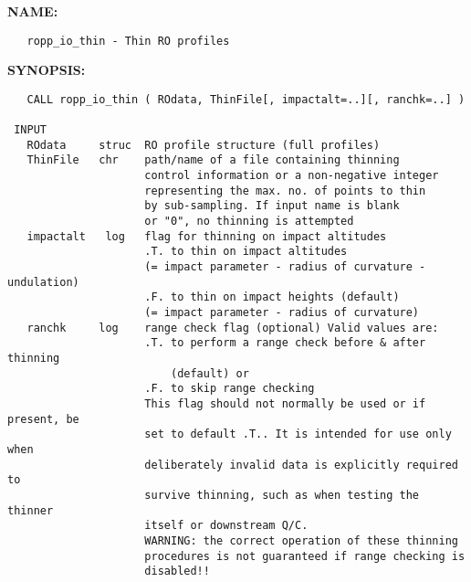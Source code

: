 \label{ch:robo107}
\label{ch:Thin_ropp_io_thin}
\textbf{NAME:}\hspace{0.08in}\begin{Verbatim}
   ropp_io_thin - Thin RO profiles
\end{Verbatim}
\textbf{SYNOPSIS:}\hspace{0.08in}\begin{Verbatim}
   CALL ropp_io_thin ( ROdata, ThinFile[, impactalt=..][, ranchk=..] )

 INPUT
   ROdata     struc  RO profile structure (full profiles)
   ThinFile   chr    path/name of a file containing thinning
                     control information or a non-negative integer
                     representing the max. no. of points to thin
                     by sub-sampling. If input name is blank
                     or "0", no thinning is attempted
   impactalt   log   flag for thinning on impact altitudes
                     .T. to thin on impact altitudes
                     (= impact parameter - radius of curvature - undulation)
                     .F. to thin on impact heights (default)
                     (= impact parameter - radius of curvature)
   ranchk     log    range check flag (optional) Valid values are:
                     .T. to perform a range check before & after thinning
                         (default) or
                     .F. to skip range checking
                     This flag should not normally be used or if present, be
                     set to default .T.. It is intended for use only when
                     deliberately invalid data is explicitly required to
                     survive thinning, such as when testing the thinner
                     itself or downstream Q/C.
                     WARNING: the correct operation of these thinning
                     procedures is not guaranteed if range checking is
                     disabled!!
\end{Verbatim}
